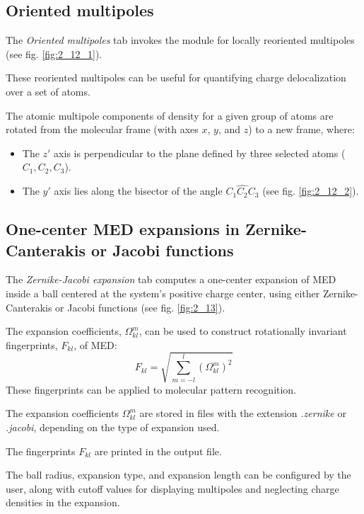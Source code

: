 \documentclass[10pt]{article}
\begin{document}
\subsection{Oriented multipoles \label{sec:2.12}}

The {\it Oriented multipoles} tab
invokes the module for locally reoriented multipoles (see fig. \ref{fig:2_12_1}).

These reoriented multipoles can be useful for quantifying
charge delocalization over a set of atoms.

The atomic multipole components of density for a given group of atoms
are rotated from the molecular frame (with axes $x$, $y$, and $z$)
to a new frame, where:

\begin{itemize}
\item The $z'$ axis is perpendicular to the plane defined
by three selected atoms ($C_1, C_2, C_3$).
\item The $y'$ axis lies along the bisector of the angle $\widehat{C_1C_2C_3}$
(see fig. \ref{fig:2_12_2}).
\end{itemize}

\subsection{One-center MED expansions in Zernike-Canterakis or Jacobi functions \label{sec:2.13}}

The {\it Zernike-Jacobi expansion} tab computes a one-center expansion
of MED inside a ball centered at the system's positive charge center,
using either Zernike-Canterakis or Jacobi functions (see fig. \ref{fig:2_13}).

The expansion coefficients, $\Omega_{kl}^m$,
can be used to construct rotationally invariant fingerprints, $F_{kl}$, of MED:
% 
$$ 
F_{kl} = \sqrt{ \sum_{m=-l}^l (\Omega_{kl}^m)^2 } 
$$
%
These fingerprints can be applied to molecular pattern recognition.

The expansion coefficients $\Omega_{kl}^m$ are stored in files
with the extension {\it .zernike} or {\it .jacobi},
depending on the type of expansion used.

The fingerprints $F_{kl}$ are printed in the output file.

The ball radius, expansion type, and expansion length can be configured by the user,
along with cutoff values for displaying multipoles and neglecting charge densities in the expansion.
\end{document}
